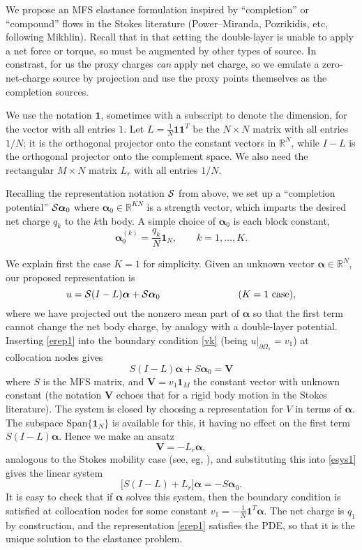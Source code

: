 \documentclass[10pt]{article}
\newcommand{\be}{\begin{equation}}
\newcommand{\ee}{\end{equation}}
\newcommand{\mbf}[1]{{\mathbf #1}}
\newcommand{\R}{\mathbb{R}}
\newcommand{\qqquad}{\qquad\qquad}
\newcommand{\qqqquad}{\qqquad\qqquad}
\newcommand{\bal}{\bm{\alpha}}
\newcommand{\pO}{\partial\Omega}
\newcommand{\ok}{^{(k)}}
\newcommand{\SR}{{\cal S}}           %
\begin{document}
We propose an MFS elastance formulation
inspired by ``completion'' or ``compound'' flows in the Stokes literature
(Power--Miranda, Pozrikidis, etc, following Mikhlin).
Recall that in that setting the double-layer is unable to apply a net force
or torque, so must be augmented by other types of source.
In constrast, for us the proxy charges {\em can} apply net charge,
so we emulate a zero-net-charge source by projection and use
the proxy points themselves as the completion sources.

We use the notation $\mbf{1}$, sometimes with a subscript to denote the dimension, for the vector with all entries $1$.
Let $L = \frac{1}{N}\mbf{1}\mbf{1}^T$ be the $N\times N$ matrix
with all entries $1/N$; it is the orthogonal projector
onto the constant vectors in $\R^N$,
while $I-L$ is the orthogonal projector onto the complement space.
We also need the rectangular $M\times N$ matrix
$L_r$ with all entries $1/N$.

Recalling the representation notation $\SR$ from above,
we set up a ``completion potential'' $\SR\bal_0$
where $\bal_0\in\R^{KN}$ is a strength vector,
which imparts the desired net charge $q_k$ to the $k$th body.
A simple choice of $\bal_0$ is each block constant,
\be
\bal_0\ok = \frac{q_k}{N}\mbf{1}_N, \qquad k=1,\dots,K.
\label{al0}
\ee

We explain first the case $K=1$ for simplicity.
Given an unknown vector $\bal\in\R^{N}$,
our proposed representation is
\be
u = \SR (I-L)\bal + \SR\bal_0 \qqqquad \mbox{($K=1$ case)},
\label{erep1}
\ee
where we have projected out the nonzero mean part of $\bal$ so that the
first term cannot change the net body charge, by analogy
with a double-layer potential.
Inserting \eqref{erep1} into the boundary condition \eqref{vk}
(being $u|_{\pO_1} = v_1$) at collocation nodes gives
\be
S(I-L)\bal + S\bal_0 = \mbf{V}
\label{esys1}
\ee
where $S$ is the MFS matrix, and $\mbf{V} = v_1\mbf{1}_M$ the constant
vector with unknown constant (the notation $\mbf{V}$ echoes
that for a rigid body motion in the Stokes literature).
The system is closed by choosing a representation for $V$ in terms of
$\bal$. The subspace Span$\{\mbf{1}_N\}$ is available for this, it
having no effect on the first term $S(I-L)\bal$.
Hence we make an ansatz
\[
\mbf{V} = -L_r \bal,
\]
analogous to the Stokes mobility case
(see, eg, \cite[Sec.~4.2]{csbq}),
and substituting this into \eqref{esys1} gives the linear system
\[
\bigl[ S(I-L) + L_r \bigr] \bal = -S\bal_0.
\]
It is easy to check that if $\bal$ solves this system, then
the boundary condition is satisfied at collocation nodes
for some constant $v_1 = -\frac{1}{N}\mbf{1}^T\bal$.
The net charge is $q_1$ by construction, and the representation \eqref{erep1}
satisfies the PDE, so that it is the unique solution to the elastance
problem.
\end{document}
